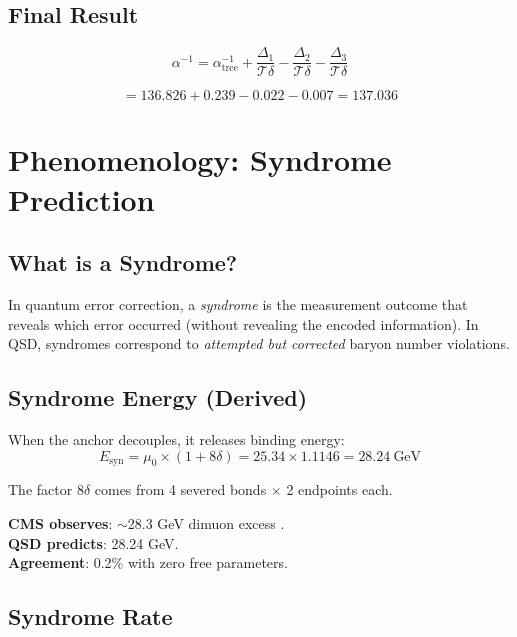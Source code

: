 \documentclass[11pt,a4paper]{article}
\theoremstyle{definition}
\newcommand{\Tc}{\mathcal{T}}           %
\newcommand{\dgeo}{\delta}              %
\newcommand{\murad}{\mu_0}              %
\newcommand{\Esyn}{E_{\text{syn}}}      %
\begin{document}
\subsection{Final Result}

\begin{equation}
\alpha^{-1} = \alpha^{-1}_{\text{tree}} + \frac{\Delta_1}{\Tc\dgeo} - \frac{\Delta_2}{\Tc\dgeo} - \frac{\Delta_3}{\Tc\dgeo}
\end{equation}

\begin{equation}
= 136.826 + 0.239 - 0.022 - 0.007 = \boxed{137.036}
\end{equation}

\section{Phenomenology: Syndrome Prediction}
\label{sec:pheno}

\subsection{What is a Syndrome?}

In quantum error correction, a \emph{syndrome} is the measurement outcome that reveals which error occurred (without revealing the encoded information). In QSD, syndromes correspond to \emph{attempted but corrected} baryon number violations.

\subsection{Syndrome Energy (Derived)}

When the anchor decouples, it releases binding energy:
\begin{equation}
\Esyn = \murad \times (1 + 8\dgeo) = 25.34 \times 1.1146 = 28.24~\text{GeV}
\end{equation}

The factor $8\dgeo$ comes from 4 severed bonds $\times$ 2 endpoints each.

\textbf{CMS observes}: $\sim$28.3 GeV dimuon excess \cite{CMS2018dimuon}.\\
\textbf{QSD predicts}: 28.24 GeV.\\
\textbf{Agreement}: 0.2\% with zero free parameters.

\subsection{Syndrome Rate}
\end{document}
